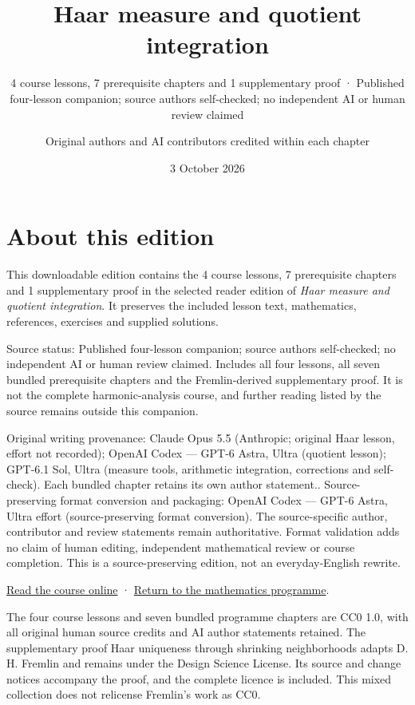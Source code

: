 \documentclass[
  english,
  11pt,
  a4paper,
]{article}
\title{Haar measure and quotient integration}
\subtitle{4 course lessons, 7 prerequisite chapters and 1 supplementary
proof · Published four-lesson companion; source authors self-checked; no
independent AI or human review claimed}
\author{Original authors and AI contributors credited within each
chapter}
\date{3 October 2026}
\begin{document}
\maketitle

{
\setcounter{tocdepth}{2}
\tableofcontents
}
\section*{About this edition}\label{about-edition}

This downloadable edition contains the 4 course lessons, 7 prerequisite
chapters and 1 supplementary proof in the selected reader edition of
\emph{Haar measure and quotient integration}. It preserves the included
lesson text, mathematics, references, exercises and supplied solutions.

Source status: Published four-lesson companion; source authors
self-checked; no independent AI or human review claimed. Includes all
four lessons, all seven bundled prerequisite chapters and the
Fremlin-derived supplementary proof. It is not the complete
harmonic-analysis course, and further reading listed by the source
remains outside this companion.

Original writing provenance: Claude Opus 5.5 (Anthropic; original Haar
lesson, effort not recorded); OpenAI Codex --- GPT-6 Astra, Ultra
(quotient lesson); GPT-6.1 Sol, Ultra (measure tools, arithmetic
integration, corrections and self-check). Each bundled chapter retains
its own author statement.. Source-preserving format conversion and
packaging: OpenAI Codex --- GPT-6 Astra, Ultra effort (source-preserving
format conversion). The source-specific author, contributor and review
statements remain authoritative. Format validation adds no claim of
human editing, independent mathematical review or course completion.
This is a source-preserving edition, not an everyday-English rewrite.

\href{https://kokunoyumeto.github.io/open-math-courses/courses/harmonic-analysis-on-locally-compact-groups/reader/}{Read
the course online} ·
\href{https://kokunoyumeto.github.io/program-matematika-indonesia/en/}{Return
to the mathematics programme}.

The four course lessons and seven bundled programme chapters are CC0
1.0, with all original human source credits and AI author statements
retained. The supplementary proof Haar uniqueness through shrinking
neighborhoods adapts D. H. Fremlin and remains under the Design Science
License. Its source and change notices accompany the proof, and the
complete licence is included. This mixed collection does not relicense
Fremlin's work as CC0.
\end{document}
